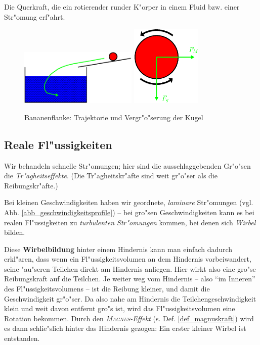 \begin{Def}
\label{def_magnuskraft}Die Querkraft, die ein
   rotierender runder K"orper in einem Fluid bzw. einer Str"omung
   erf"ahrt.
\end{Def}

\begin{figure}
   \centering
   \includegraphics[width=0.5\textwidth]{bilder/banane_traj}
\hfill
\includegraphics[width=0.3\textwidth]{bilder/banane_vekt}
   \caption{Bananenflanke: Trajektorie und Vergr"o"serung der Kugel}
   \label{abb_banane}
\end{figure}








\subsection{Reale Fl"ussigkeiten}
\label{kap_reale-flussigkeiten}

Wir behandeln schnelle Str"omungen; hier sind die ausschlaggebenden
Gr"o"sen die \emph{Tr"agheitseffekte}. (Die Tr"agheitskr"afte sind weit
gr"o"ser als die Reibungskr"afte.)


Bei kleinen Geschwindigkeiten haben wir geordnete, \emph{laminare}
Str"omungen (vgl. Abb. \ref{abb_geschwindigkeitsprofile}) -- bei
gro"sen Geschwindigkeiten kann es bei realen Fl"ussigkeiten zu
\emph{turbulenten Str"omungen} kommen, bei denen sich
\emph{Wirbel} bilden.

Diese \textbf{Wirbelbildung} hinter einem Hindernis kann man einfach
dadurch erkl"aren, dass wenn ein Fl"ussigkeitsvolumen an dem Hindernis
vorbeiwandert, seine "au"seren Teilchen direkt am Hindernis
anliegen. Hier wirkt also eine gro"se Reibungskraft auf die
Teilchen. Je weiter weg vom Hindernis -- also "`im Inneren"' des
Fl"ussigkeitsvolumens -- ist die Reibung kleiner, und damit die
Geschwindigkeit gr"o"ser. Da also nahe am Hindernis die
Teilchengeschwindigkeit klein und weit davon entfernt gro"s ist, wird
das Fl"ussigkeitsvolumen eine Rotation bekommen. Durch den
\emph{\textsc{Magnus}-Effekt} (s. Def. \ref{def_magnuskraft}) wird es
dann schlie"slich hinter das Hindernis gezogen: Ein erster kleiner
Wirbel ist entstanden.

